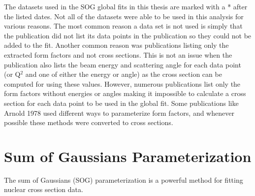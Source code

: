 The datasets used in the SOG global fits in this thesis are marked with a * after the listed dates. Not all of the datasets were able to be used in this analysis for various reasons. The most common reason a data set is not used is simply that the publication did not list its data points in the publication so they could not be added to the fit. Another common reason was publications listing only the extracted form factors and not cross sections. This is not an issue when the publication also lists the beam energy and scattering angle for each data point (or Q$^2$ and one of either the energy or angle) as the cross section can be computed for using these values. However, numerous publications list only the form factors without energies or angles making it impossible to calculate a cross section for each data point to be used in the global fit. Some publications like Arnold 1978 used different ways to parameterize form factors, and whenever possible these methods were converted to cross sections.

\section{Sum of Gaussians Parameterization}
\label{sec:sog}

The sum of Gaussians (SOG) parameterization is a powerful method for fitting nuclear cross section data. 
